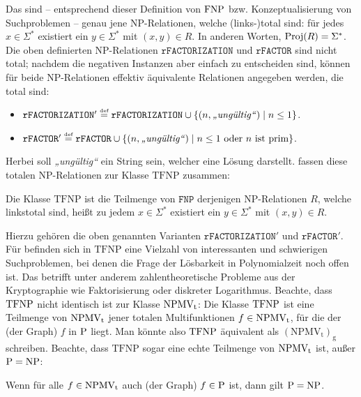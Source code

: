 Das sind – entsprechend dieser Definition von $\FNP$ bzw. Konzeptualisierung von Suchproblemen – genau jene NP-Relationen, welche (links-)total sind: für jedes $x\in\Sigma^*$ existiert ein $y\in\Sigma^*$ mit $(x,y)\in R$. In anderen Worten, $\Proj(R)=\Sigma^*$.
Die oben definierten NP-Relationen $\mathtt{rFACTORIZATION}$ und $\mathtt{rFACTOR}$ sind nicht total; nachdem die negativen Instanzen aber einfach zu entscheiden sind, können für beide NP-Relationen effektiv äquivalente Relationen angegeben werden, die total sind:
\begin{itemize} \item $\mathtt{rFACTORIZATION}' \defeq \mathtt{rFACTORIZATION} \cup \{ (n, \text{\emph{„ungültig“}}) \mid n\leq 1 \}$.
    \item $\mathtt{rFACTOR}' \defeq \mathtt{rFACTOR} \cup \{ (n, \text{\emph{„ungültig“}}) \mid n\leq 1 \text{ oder $n$ ist prim} \}$.
\end{itemize}
Herbei soll \emph{„ungültig“} ein String sein, welcher eine Lösung darstellt.
\textcite{megiddo_total_1991} fassen diese totalen NP-Relationen zur Klasse $\mathrm{TFNP}$ zusammen:
\begin{definition}
    Die Klasse $\mathrm{TFNP}$ ist die Teilmenge von $\mathtt{FNP}$ derjenigen NP-Relationen $R$, welche linkstotal sind, heißt zu jedem $x\in\Sigma^*$ existiert ein $y\in\Sigma^*$ mit $(x,y)\in R$.
\end{definition}
Hierzu gehören die oben genannten Varianten $\mathtt{rFACTORIZATION}'$ und $\mathtt{rFACTOR}'$.
Für \citeauthor{megiddo_total_1991} befinden sich in $\mathrm{TFNP}$ eine Vielzahl von interessanten und schwierigen Suchproblemen, bei denen die Frage der Lösbarkeit in Polynomialzeit noch offen ist.
Das betrifft unter anderem zahlentheoretische Probleme aus der Kryptographie wie Faktorisierung oder diskreter Logarithmus. Beachte, dass $\TFNP$ nicht identisch ist zur Klasse $\NPMVt$: Die Klasse $\TFNP$ ist eine Teilmenge von $\NPMVt$ jener totalen Multifunktionen $f\in\NPMVt$, für die der (der Graph) $f$ in $\P$ liegt. Man könnte also $\TFNP$ äquivalent als $\mathrm{(NPMV_{t})_{g}}$ schreiben.
Beachte, dass $\mathrm{TFNP}$ sogar eine echte Teilmenge von $\NPMVt$ ist, außer $\P=\NP$:
\begin{observation}\label{obs:npmvt-properin-tfnp}
    Wenn für alle $f\in\NPMVt$ auch (der Graph) $f\in \P$ ist, dann gilt $\P=\NP$.
\end{observation}
